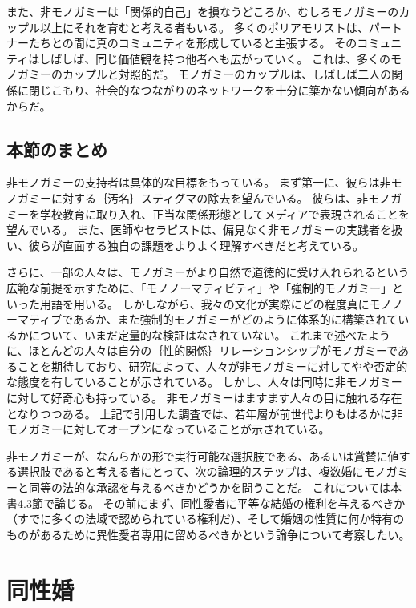 \documentclass[paper=a4,book,openany]{jlreq}
\begin{document}
また、非モノガミーは「関係的自己」を損なうどころか、むしろモノガミーのカップル以上にそれを育むと考える者もいる。
多くのポリアモリストは、パートナーたちとの間に真のコミュニティを形成していると主張する。
そのコミュニティはしばしば、同じ価値観を持つ他者へも広がっていく。
これは、多くのモノガミーのカップルと対照的だ。
モノガミーのカップルは、しばしば二人の関係に閉じこもり、社会的なつながりのネットワークを十分に築かない傾向があるからだ。

\subsection{本節のまとめ}

非モノガミーの支持者は具体的な目標をもっている。
まず第一に、彼らは非モノガミーに対する｛汚名｝{スティグマ}の除去を望んでいる。
彼らは、非モノガミーを学校教育に取り入れ、正当な関係形態としてメディアで表現されることを望んでいる。
また、医師やセラピストは、偏見なく非モノガミーの実践者を扱い、彼らが直面する独自の課題をよりよく理解すべきだと考えている。

さらに、一部の人々は、モノガミーがより自然で道徳的に受け入れられるという広範な前提を示すために、「モノノーマティビティ」や「強制的モノガミー」といった用語を用いる。
しかしながら、我々の文化が実際にどの程度真にモノノーマティブであるか、また強制的モノガミーがどのように体系的に構築されているかについて、いまだ定量的な検証はなされていない。
これまで述べたように、ほとんどの人々は自分の｛性的関係｝{リレーションシップ}がモノガミーであることを期待しており、研究によって、人々が非モノガミーに対してやや否定的な態度を有していることが示されている\citep{conley13:_fewer_merrier}。
しかし、人々は同時に非モノガミーに対して好奇心も持っている。
非モノガミーはますます人々の目に触れる存在となりつつある。
上記で引用した調査では、若年層が前世代よりもはるかに非モノガミーに対してオープンになっていることが示されている。

非モノガミーが、なんらかの形で実行可能な選択肢である、あるいは賞賛に値する選択肢であると考える者にとって、次の論理的ステップは、複数婚にモノガミーと同等の法的な承認を与えるべきかどうかを問うことだ。
これについては本書4.3節で論じる。
その前にまず、同性愛者に平等な結婚の権利を与えるべきか（すでに多くの法域で認められている権利だ）、そして婚姻の性質に何か特有のものがあるために異性愛者専用に留めるべきかという論争について考察したい。

\section{同性婚}
\end{document}
